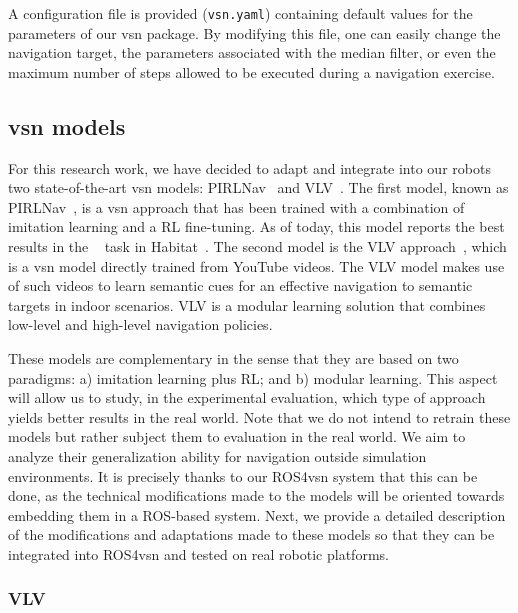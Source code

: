 A configuration file is provided (\texttt{vsn.yaml}) containing default values for the parameters of our \acrshort{vsn} package.
By modifying this file, one can easily change the navigation target, the parameters associated with the median filter, or even the maximum number of steps allowed to be executed during a navigation exercise.


\subsection{\acrshort{vsn} models}\label{subsec:vsn_models}
For this research work, we have decided to adapt and integrate into our robots two state-of-the-art \acrshort{vsn} models: PIRLNav~\cite{ramrakhya2023} and VLV~\cite{chang2020}.
The first model, known as PIRLNav~\cite{ramrakhya2023}, is a \acrshort{vsn} approach that has been trained with a combination of imitation learning and a RL fine-tuning.
As of today, this model reports the best results in the \objnav~\cite{batra2020} task in Habitat~\cite{NEURIPS2021_021bbc7e}.
The second model is the VLV approach~\cite{chang2020}, which is a \acrshort{vsn} model directly trained from YouTube videos.
The VLV model makes use of such videos to learn semantic cues for an effective navigation to semantic targets in indoor scenarios.
VLV is a modular learning solution that combines low-level and high-level navigation policies.

These models are complementary in the sense that they are based on two paradigms: a) imitation learning plus RL; and b) modular learning.
This aspect will allow us to study, in the experimental evaluation, which type of approach yields better results in the real world.
Note that we do not intend to retrain these models but rather subject them to evaluation in the real world.
We aim to analyze their generalization ability for navigation outside simulation environments.
It is precisely thanks to our ROS4\acrshort{vsn} system that this can be done, as the technical modifications made to the models will be oriented towards embedding them in a ROS-based system.
Next, we provide a detailed description of the modifications and adaptations made to these models so that they can be integrated into ROS4\acrshort{vsn} and tested on real robotic platforms.

\subsubsection{VLV}

